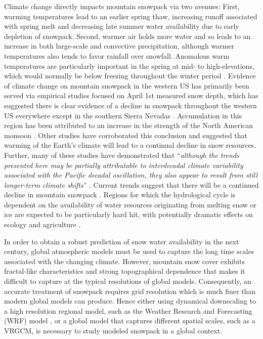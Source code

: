 \documentclass[11pt]{article}
\begin{document}
Climate change directly impacts mountain snowpack via two avenues: First, warming temperatures lead to an earlier spring thaw, increasing runoff associated with spring melt and decreasing late summer water availability due to early depletion of snowpack. Second, warmer air holds more water and so leads to an increase in both large-scale and convective precipitation, although warmer temperatures also tends to favor rainfall over snowfall. Anomalous warm temperatures are particularly important in the spring at mid- to high-elevations, which would normally be below freezing throughout the winter period \citep{cayan1996interannual,stewart2009changes}. Evidence of climate change on mountain snowpack in the western US has primarily been served via empirical studies focused on April 1st measured snow depth, which has suggested there is clear evidence of a decline in snowpack throughout the western US everywhere except in the southern Sierra Nevadas \citep{mote_declining_2005}. Accumulation in this region has been attributed to an increase in the strength of the North American monsoon \citep{dyer2006spatial}. Other studies have corroborated this conclusion \citep{dettinger1995large,mote_declining_2005,knowles2006trends} and suggested that warming of the Earth’s climate will lead to a continual decline in snow resources. Further, many of these studies have demonstrated that “\textit{although the trends presented here may be partially attributable to interdecadal climate variability associated with the Pacific decadal oscillation, they also appear to result from still longer-term climate shifts}” \citep{knowles2006trends}. Current trends suggest that there will be a continued decline in mountain snowpack \citep{stewart2009changes}. Regions for which the hydrological cycle is dependent on the availability of water resources originating from melting snow or ice are expected to be particularly hard hit, with potentially dramatic effects on ecology and agriculture \citep{barnett2005potential}.

In order to obtain a robust prediction of snow water availability in the next century, global atmospheric models must be used to capture the long time scales associated with the changing climate.  However, mountain snow cover exhibits fractal-like characteristics and strong topographical dependence that makes it difficult to capture at the typical resolutions of global models. Consequently, an accurate treatment of snowpack requires grid resolution which is much finer than modern global models can produce. Hence either using dynamical downscaling to a high resolution regional model, such as the Weather Research and Forecasting (WRF) model \citep{michalakes2001development}, or a global model that captures different spatial scales, such as a VRGCM, is necessary to study modeled snowpack in a global context.
\end{document}
